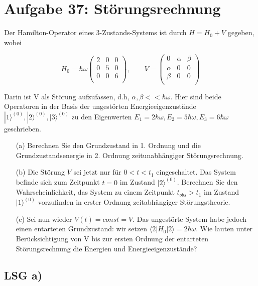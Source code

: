 



\section*{Aufgabe 37: Störungsrechnung}

Der Hamilton-Operator eines 3-Zustands-Systems ist durch \(H=H_0+V\) gegeben, wobei

\[H_0 = \hbar\omega \begin{pmatrix}2&0&0\\ 0&5&0\\ 0&0&6\\ \end{pmatrix}, \qquad V = \begin{pmatrix}0&\alpha&\beta\\ \alpha&0&0\\ \beta&0&0\\ \end{pmatrix} \]

Darin ist V als Störung aufzufassen, d.h, \(\alpha,\beta << \hbar\omega\). Hier sind beide Operatoren in der Basis der ungestörten Energieeigenzustände \(|1\rangle^{(0)}, |2\rangle^{(0)},|3\rangle^{(0)} \) zu den Eigenwerten \(E_1 = 2\hbar\omega, E_2 = 5\hbar\omega, E_3 = 6\hbar\omega\) geschrieben.

\begin{enumerate}
\item[(a)] Berechnen Sie den Grundzustand in 1. Ordnung und die Grundzustandsenergie in 2. Ordnung zeitunabhängiger Störungsrechnung.
\item[(b)] Die Störung \(V\) sei jetzt nur für \(0<t<t_1\) eingeschaltet. Das System befinde sich zum Zeitpunkt \(t=0\) im Zustand \(|2\rangle^{(0)} \). Berechnen Sie den Wahrscheinlichkeit, das System zu einem Zeitpunkt \(t_{obs}>t_1\) im Zustand  \(|1\rangle^{(0)} \) vorzufinden in erster Ordnung zeitabhängiger Störungstheorie.

\item[(c)] Sei nun wieder \(V(t) = const = V\). Das ungestörte System habe jedoch einen entarteten Grundzustand: wir setzen \(\langle 2|H_0|2\rangle =2\hbar\omega\). Wie lauten unter Berücksichtigung von V bis zur ersten Ordnung der entarteten Störungsrechnung die Energien und Energieeigenzustände?
\end{enumerate}




\subsection*{LSG a)}

